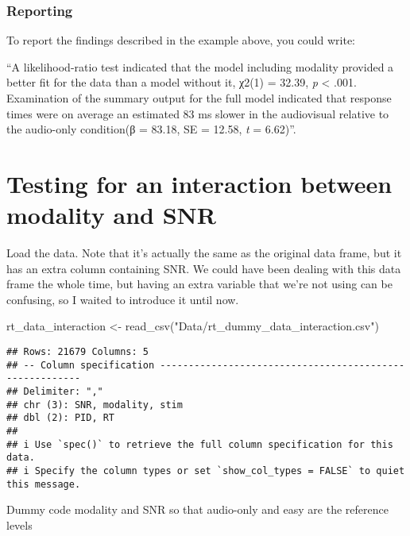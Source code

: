 \documentclass[
]{article}
\newenvironment{Shaded}{\begin{snugshade}}{\end{snugshade}}
\newcommand{\FunctionTok}[1]{\textcolor[rgb]{0.00,0.00,0.00}{#1}}
\newcommand{\NormalTok}[1]{#1}
\newcommand{\OtherTok}[1]{\textcolor[rgb]{0.56,0.35,0.01}{#1}}
\newcommand{\StringTok}[1]{\textcolor[rgb]{0.31,0.60,0.02}{#1}}
\begin{document}
\hypertarget{reporting}{%
\subsubsection{Reporting}\label{reporting}}

To report the findings described in the example above, you could write:

``A likelihood-ratio test indicated that the model including modality
provided a better fit for the data than a model without it, χ2(1) =
32.39, \emph{p} \textless{} .001. Examination of the summary output for
the full model indicated that response times were on average an
estimated 83 ms slower in the audiovisual relative to the audio-only
condition(β = 83.18, SE = 12.58, \emph{t} = 6.62)''.

\hypertarget{testing-for-an-interaction-between-modality-and-snr}{%
\section{Testing for an interaction between modality and
SNR}\label{testing-for-an-interaction-between-modality-and-snr}}

Load the data. Note that it's actually the same as the original data
frame, but it has an extra column containing SNR. We could have been
dealing with this data frame the whole time, but having an extra
variable that we're not using can be confusing, so I waited to introduce
it until now.

\begin{Shaded}
\begin{Highlighting}[]
\NormalTok{rt\_data\_interaction }\OtherTok{\textless{}{-}} \FunctionTok{read\_csv}\NormalTok{(}\StringTok{"Data/rt\_dummy\_data\_interaction.csv"}\NormalTok{)}
\end{Highlighting}
\end{Shaded}

\begin{verbatim}
## Rows: 21679 Columns: 5
## -- Column specification --------------------------------------------------------
## Delimiter: ","
## chr (3): SNR, modality, stim
## dbl (2): PID, RT
## 
## i Use `spec()` to retrieve the full column specification for this data.
## i Specify the column types or set `show_col_types = FALSE` to quiet this message.
\end{verbatim}

Dummy code modality and SNR so that audio-only and easy are the
reference levels
\end{document}
